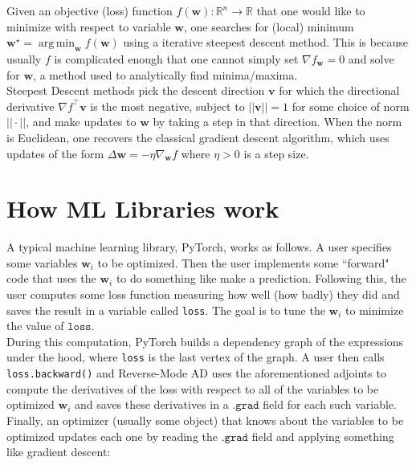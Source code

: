 \documentclass[11pt]{article}
\theoremstyle{definition}
\theoremstyle{plain}
\DeclareMathOperator*{\argmin}{arg\,min}
\renewcommand{\v}[1]{\mathbf{#1}}
\renewcommand{\b}[1]{\mathbb{#1}}
\begin{document}
\noindent Given an objective (loss) function $f(\v{w}): \b{R}^n \rightarrow \b{R}$
that one would like to minimize with respect to variable $\v{w}$,
one searches for (local) minimum $\v{w}^\star = \argmin_{\v{w}} f(\v{w})$ 
using a iterative steepest descent method. This is because usually
$f$ is complicated enough that one cannot simply set $\nabla f_{\v{w}} = 0$ and solve
for $\v{w}$, a method used to analytically find minima/maxima.\\

\noindent Steepest Descent methods pick the descent direction $\v{v}$ for which
the directional derivative $\nabla f^\top \v{v}$ is the most negative, subject
to $||\v{v}|| = 1$ for some choice of norm $||\cdot||$, and make updates to
$\v{w}$ by taking a step in that direction. When the norm is Euclidean, one
recovers the classical gradient descent algorithm, which uses
updates of the form $\Delta \v{w} = - \eta \nabla_{\v{w}} f$
where $\eta > 0$ is a step size.\\ 

\section{How ML Libraries work}

\noindent A typical machine learning library, PyTorch, works as follows.
A user specifies some variables $\v{w}_i$ to be optimized. Then the user
implements some ``forward" code that uses the $\v{w}_i$ to do something like make
a prediction. Following this, the user computes some loss function measuring
how well (how badly) they did and saves the result in a variable called \texttt{loss}. 
The goal is to tune the $\v{w}_i$ to minimize the value of $\texttt{loss}$.\\

\noindent During this computation, PyTorch builds a dependency graph of the 
expressions under the hood, where \texttt{loss} is the last vertex of the graph. 
A user then calls \texttt{loss.backward()} and Reverse-Mode AD uses the aforementioned
adjoints to compute the derivatives of the loss with respect to all of the variables
to be optimized $\v{w}_i$ and saves these derivatives in a $\texttt{.grad}$ field
for each such variable.\\

\noindent Finally, an optimizer (usually some object) that knows about the variables
to be optimized updates each one by reading the $\texttt{.grad}$ field and
applying something like gradient descent:
\end{document}
